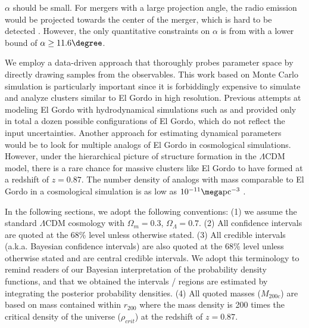 $\alpha$ should be small. For mergers with a
large projection angle, the radio emission would be projected towards the
center of the merger, which is hard to be detected \citep{Vazza11}.
However, the only quantitative constraints on $\alpha$ is from \cite{L13}
with a lower bound of $\alpha \geq 11.6 \degree$.  
\par 
We employ a data-driven approach that thoroughly probes parameter
space by directly drawing samples from the observables. 
This work based on Monte Carlo simulation is particularly important since
it is forbiddingly expensive to simulate and analyze clusters similar to El
Gordo in high resolution. Previous attempts at modeling El Gordo with hydrodynamical
simulations such as \cite{Donnert13} and \cite{Molnar14} provided only in
total a dozen possible configurations of El Gordo, which do not
reflect the input uncertainties. Another approach for
estimating dynamical parameters would be to look for multiple analogs of El Gordo in cosmological
simulations.  However, under the hierarchical picture
of structure formation in the $\Lambda$CDM model, there is a rare chance
for massive clusters like El Gordo to have formed at a redshift of $z = 0.87$.  
The number density of analogs with mass comparable to El Gordo in a
cosmological simulation is as low as $10^{-11} \mega\text{pc}^{-3}$ .  
\par
In the following sections, we adopt the following conventions: (1) we
assume the standard $\Lambda$CDM cosmology with $\Omega_{m} = 0.3$, $\Omega_{\Lambda} = 0.7$. (2) All confidence intervals are quoted at the 68\% level unless otherwise stated. 
(3) All credible intervals (a.k.a. Bayesian confidence intervals) are also
quoted at the 68\% level unless otherwise stated and are central credible
intervals. We adopt this terminology to remind readers of our Bayesian
interpretation of the probability density functions, and that we obtained
the intervals / regions are estimated by integrating the posterior
probability densities.  
(4) All quoted masses ($M_{200c}$) are based on mass contained
within $r_{200}$ where the mass density is 200 times the critical density
of the universe ($\rho_{crit}$) at the redshift of $z = 0.87$. 
